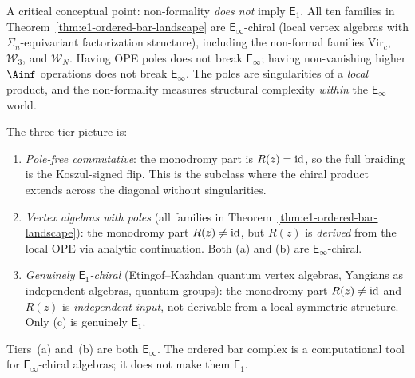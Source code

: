 \begin{remark}%
\label{rem:formality-e1-e-infty}%
%
%
%
A critical conceptual point: non-formality \emph{does not}
imply $\mathsf{E}_1$. All ten families in
Theorem~\textup{\ref{thm:e1-ordered-bar-landscape}} are
$\mathsf{E}_\infty$-chiral \textup{(}local vertex algebras with
$\Sigma_n$-equivariant factorization structure\textup{)}, including
the non-formal families $\mathrm{Vir}_c$, $\mathcal{W}_3$, and
$\mathcal{W}_N$. Having OPE poles does not break
$\mathsf{E}_\infty$; having non-vanishing higher $\Ainf$
operations does not break $\mathsf{E}_\infty$. The poles
are singularities of a \emph{local} product, and the
non-formality measures structural complexity \emph{within}
the $\mathsf{E}_\infty$ world.

The three-tier picture is:
\begin{enumerate}[label=\textup{(\alph*)}]
\item \emph{Pole-free commutative}:
 the monodromy part is $R(z)=\mathrm{id}$, so the full braiding is the
 Koszul-signed flip.
 This is the subclass where the chiral product extends
 across the diagonal without singularities.

\item \emph{Vertex algebras with poles}
 \textup{(}all families in Theorem~\ref{thm:e1-ordered-bar-landscape}\textup{)}:
 the monodromy part $R(z) \ne \mathrm{id}$, but $R(z)$ is \emph{derived} from the
 local OPE via analytic continuation.
 Both (a) and (b) are $\mathsf{E}_\infty$-chiral.

\item \emph{Genuinely $\mathsf{E}_1$-chiral}
\textup{(}Etingof--Kazhdan quantum vertex algebras,
Yangians as independent algebras, quantum groups\textup{)}:
 the monodromy part $R(z) \ne \mathrm{id}$ and $R(z)$ is
 \emph{independent input},
 not derivable from a local symmetric structure.
 Only (c) is genuinely $\mathsf{E}_1$.
\end{enumerate}
Tiers~(a) and~(b) are both $\mathsf{E}_\infty$.
The ordered bar complex is a computational tool for
$\mathsf{E}_\infty$-chiral algebras; it does not make them
$\mathsf{E}_1$.
\end{remark}

